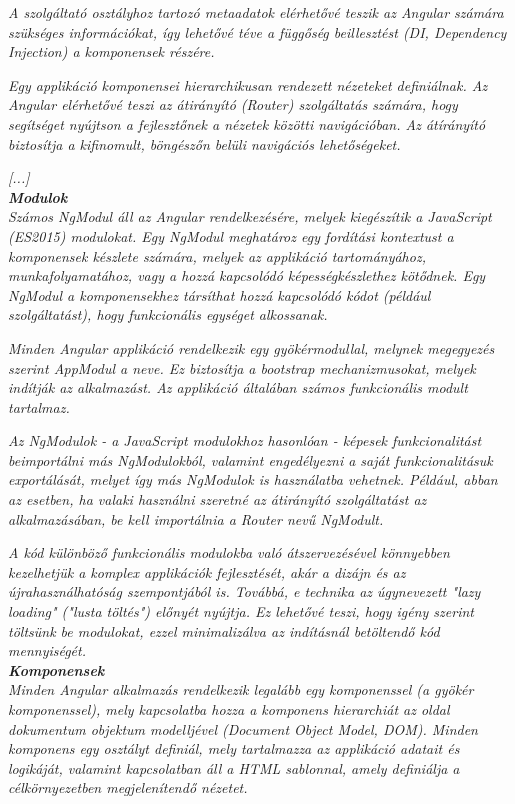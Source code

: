 \textit{A szolgáltató osztályhoz tartozó metaadatok elérhetővé teszik az Angular számára szükséges információkat, így lehetővé téve a függőség beillesztést (DI, Dependency Injection) a komponensek részére.}

\textit{Egy applikáció komponensei hierarchikusan rendezett nézeteket definiálnak. Az Angular elérhetővé teszi az átirányító (Router) szolgáltatás számára, hogy segítséget nyújtson a fejlesztőnek a nézetek közötti navigációban. Az átírányító biztosítja a kifinomult, böngészőn belüli navigációs lehetőségeket.}

\textit{[...]}\\

\noindent\textit{\textbf{Modulok}}\\

\textit{Számos NgModul áll az Angular rendelkezésére, melyek kiegészítik a JavaScript (ES2015) modulokat. Egy NgModul meghatároz egy fordítási kontextust a komponensek készlete számára, melyek az applikáció tartományához, munkafolyamatához, vagy a hozzá kapcsolódó képességkészlethez kötődnek. Egy NgModul a komponensekhez társíthat hozzá kapcsolódó kódot (például szolgáltatást), hogy funkcionális egységet alkossanak.}

\textit{Minden Angular applikáció rendelkezik egy gyökérmodullal, melynek megegyezés szerint AppModul a neve. Ez biztosítja a bootstrap mechanizmusokat, melyek indítják az  alkalmazást. Az applikáció általában számos funkcionális modult tartalmaz.}

\textit{Az NgModulok - a JavaScript modulokhoz hasonlóan - képesek funkcionalitást beimportálni más NgModulokból, valamint engedélyezni a saját funkcionalitásuk exportálását, melyet így más NgModulok is használatba vehetnek. Például, abban az esetben, ha valaki használni szeretné az átirányító szolgáltatást az alkalmazásában, be kell importálnia a Router nevű NgModult.}

\textit{A kód különböző funkcionális modulokba való átszervezésével könnyebben kezelhetjük a komplex applikációk fejlesztését, akár a dizájn és az újrahasználhatóság szempontjából is. Továbbá, e technika az úgynevezett "lazy loading" ("lusta töltés") előnyét nyújtja. Ez lehetővé teszi, hogy igény szerint töltsünk be modulokat, ezzel minimalizálva az indításnál betöltendő kód mennyiségét.}\\

\noindent\textit{\textbf{Komponensek}}\\

\textit{Minden Angular alkalmazás rendelkezik legalább egy komponenssel (a gyökér komponenssel), mely kapcsolatba hozza a komponens hierarchiát az oldal dokumentum objektum modelljével (Document Object Model, DOM). Minden komponens egy osztályt definiál, mely tartalmazza az applikáció adatait és logikáját, valamint kapcsolatban áll a HTML sablonnal, amely definiálja a célkörnyezetben megjelenítendő nézetet.}

